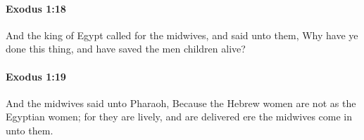 		\paragraph{Exodus 1:18} %
			\label{EXODUS-1-18}

			And the king of Egypt called for the midwives, and said unto them, Why have ye done this thing, and have saved the men children alive?


		\paragraph{Exodus 1:19} %
			\label{EXODUS-1-19}

			And the midwives said unto Pharaoh, Because the Hebrew women are not as the Egyptian women; for they are lively, and are delivered ere the midwives come in unto them.



